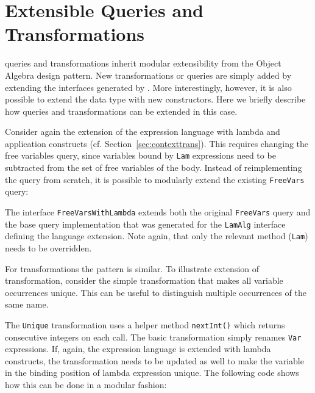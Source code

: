 

\section{Extensible Queries and Transformations}
\label{SECT:extensible}


\noindent \name queries and transformations inherit modular
extensibility from the Object Algebra design pattern.  New
transformations or queries are simply added by extending the
interfaces generated by \name.  More interestingly, however, it is
also possible to extend the data type with new constructors.  Here we
briefly describe how queries and transformations can be extended in
this case.

Consider again the extension of the expression language with lambda
and application constructs (cf. Section~\ref{sec:contexttrans}).  This
requires changing the free variables query, since variables bound by
\lstinline{Lam} expressions need to be subtracted from the set of free
variables of the body.  Instead of reimplementing the query from
scratch, it is possible to modularly extend the existing
\lstinline{FreeVars} query:


The interface \lstinline{FreeVarsWithLambda} extends both the original \lstinline{FreeVars} query and the base query implementation that was generated for the \lstinline{LamAlg} interface defining the language extension.
Note again, that only the relevant method (\lstinline{Lam}) needs to be overridden.


For transformations the pattern is similar.
To illustrate extension of transformation, consider the simple transformation that makes all variable occurrences unique.
This can be useful to distinguish multiple occurrences of the same name.


The \lstinline{Unique} transformation uses a helper method \lstinline{nextInt()} which returns consecutive integers on each call.
The basic transformation simply renames \lstinline{Var} expressions.
If, again, the expression language is extended with lambda constructs, the transformation needs to be updated as well to make the variable in the binding position of lambda expression unique.
The following code shows how this can be done in a modular fashion:

